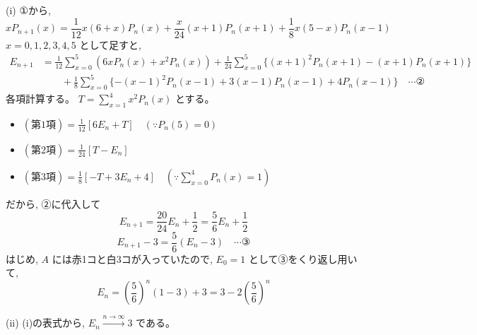 \documentclass[../main.tex]{subfiles}
\begin{document}
(i) ①から,
\[
  x P_{n+1}(x) = \frac{1}{12} x (6+x) P_n(x) + \frac{x}{24} (x+1) P_n(x+1) + \frac{1}{8} x (5-x) P_n(x-1)
\]
$x = 0, 1, 2, 3, 4, 5$ として足すと,
\[
  \begin{aligned}
    E_{n+1} &= \frac{1}{12} \sum_{x=0}^5 (6x P_n(x) + x^2 P_n(x)) + \frac{1}{24} \sum_{x=0}^5 \{(x+1)^2 P_n(x+1) - (x+1) P_n(x+1)\} \\
    &\qquad + \frac{1}{8} \sum_{x=0}^5 \{-(x-1)^2 P_n(x-1) + 3(x-1) P_n(x-1) + 4 P_n(x-1)\} \quad \cdots \text{②}
  \end{aligned}
\]
各項計算する。 $T = \sum_{x=1}^4 x^2 P_n(x)$ とする。
\begin{itemize}
  \item $(\text{第1項}) = \frac{1}{12} [ 6 E_n + T ] \quad (\because P_n(5) = 0)$
  \item $(\text{第2項}) = \frac{1}{24} [ T - E_n ]$
  \item $(\text{第3項}) = \frac{1}{8} [ -T + 3 E_n + 4 ] \quad (\because \sum_{x=0}^4 P_n(x) = 1)$
\end{itemize}
だから, ②に代入して
\[
  E_{n+1} = \frac{20}{24} E_n + \frac{1}{2} = \frac{5}{6} E_n + \frac{1}{2}
\]
\[
  E_{n+1} - 3 = \frac{5}{6} (E_n - 3) \quad \cdots \text{③}
\]
はじめ, $A$ には赤1コと白3コが入っていたので, $E_0 = 1$ として③をくり返し用いて,
\[
  E_n = \left(\frac{5}{6}\right)^n (1 - 3) + 3 = 3 - 2 \left(\frac{5}{6}\right)^n
\]

(ii) (i)の表式から, $E_n \xrightarrow{n \to \infty} 3$ である。
\end{document}
